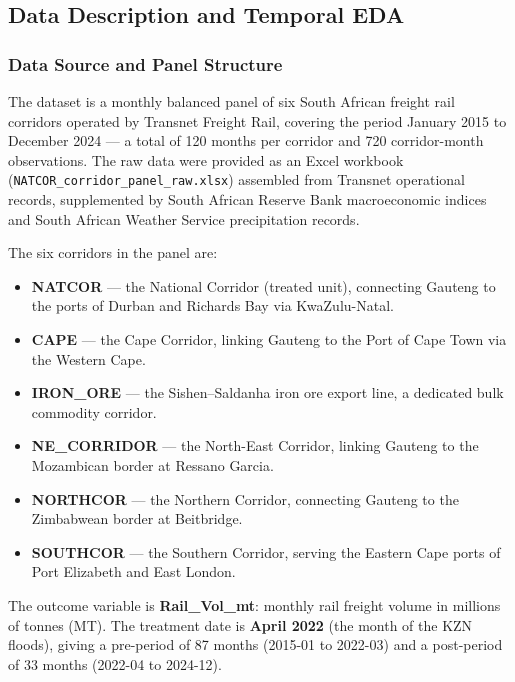 \subsection{Data Description and Temporal EDA}
\label{sec:data}

\subsubsection{Data Source and Panel Structure}
\label{sec:datasource}

The dataset is a monthly balanced panel of six South African freight
rail corridors operated by Transnet Freight Rail, covering the period
January 2015 to December 2024 --- a total of 120 months per corridor
and 720 corridor-month observations.
The raw data were provided as an Excel workbook
(\texttt{NATCOR\_corridor\_panel\_raw.xlsx}) assembled from
Transnet operational records, supplemented by South African Reserve
Bank macroeconomic indices and South African Weather Service
precipitation records.

The six corridors in the panel are:
\begin{itemize}
  \item \textbf{NATCOR} --- the National Corridor (treated unit),
        connecting Gauteng to the ports of Durban and Richards Bay
        via KwaZulu-Natal.
  \item \textbf{CAPE} --- the Cape Corridor, linking Gauteng to
        the Port of Cape Town via the Western Cape.
  \item \textbf{IRON\_ORE} --- the Sishen--Saldanha iron ore
        export line, a dedicated bulk commodity corridor.
  \item \textbf{NE\_CORRIDOR} --- the North-East Corridor,
        linking Gauteng to the Mozambican border at Ressano Garcia.
  \item \textbf{NORTHCOR} --- the Northern Corridor, connecting
        Gauteng to the Zimbabwean border at Beitbridge.
  \item \textbf{SOUTHCOR} --- the Southern Corridor, serving the
        Eastern Cape ports of Port Elizabeth and East London.
\end{itemize}

The outcome variable is \textbf{Rail\_Vol\_mt}: monthly rail freight
volume in millions of tonnes (MT).
The treatment date is \textbf{April 2022} (the month of the KZN
floods), giving a pre-period of 87 months (2015-01 to 2022-03)
and a post-period of 33 months (2022-04 to 2024-12).

